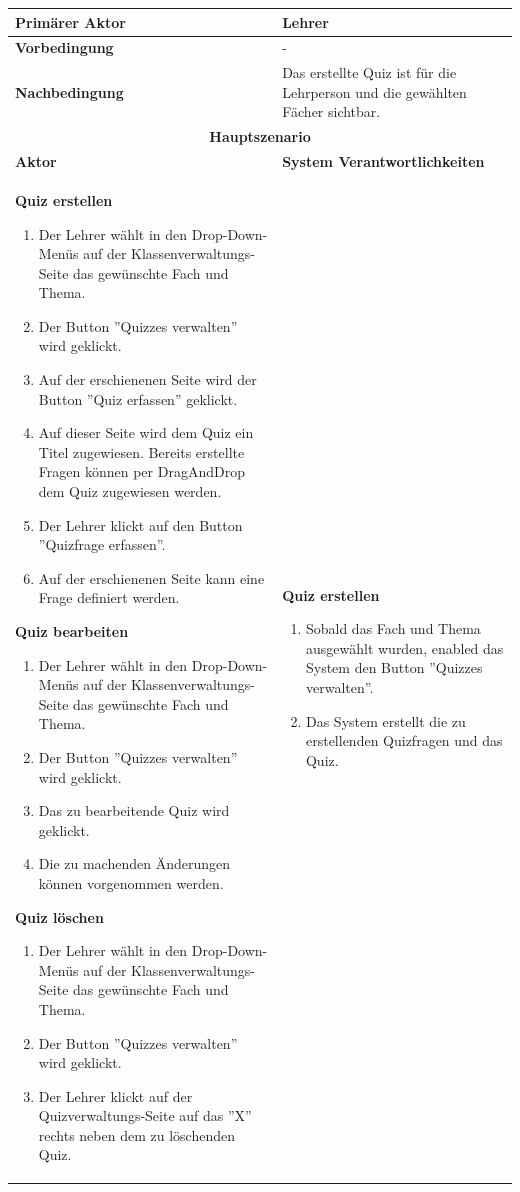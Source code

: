 \begin{tabularx}{\textwidth}{| X | X |}
	\hline
		\textbf{Primärer Aktor} & Lehrer \\
	\hline
		\textbf{Vorbedingung} & - \\
	\hline
		\textbf{Nachbedingung} & Das erstellte Quiz ist für die Lehrperson und die gewählten Fächer sichtbar. \\
	\hline
		\multicolumn{2}{|c|}{\textbf{Hauptszenario}} \\
	\hline
		\textbf{Aktor} & \textbf{System Verantwortlichkeiten} \\
	\hline
		\textbf{Quiz erstellen}
		\begin{enumerate}
			\item Der Lehrer wählt in den Drop-Down-Menüs auf der Klassenverwaltungs-Seite das gewünschte Fach und Thema.
			\item Der Button ''Quizzes verwalten'' wird geklickt.
			\item Auf der erschienenen Seite wird der Button ''Quiz erfassen'' geklickt.
			\item Auf dieser Seite wird dem Quiz ein Titel zugewiesen. Bereits erstellte Fragen können per DragAndDrop dem Quiz zugewiesen werden. 
			\item Der Lehrer klickt auf den Button ''Quizfrage erfassen''.
			\item Auf der erschienenen Seite kann eine Frage definiert werden. 
		\end{enumerate}
		
		\textbf{Quiz bearbeiten}
		\begin{enumerate}
			\item Der Lehrer wählt in den Drop-Down-Menüs auf der Klassenverwaltungs-Seite das gewünschte Fach und Thema.
			\item Der Button ''Quizzes verwalten'' wird geklickt.
			\item Das zu bearbeitende Quiz wird geklickt.
			\item Die zu machenden Änderungen können vorgenommen werden.
		\end{enumerate} 
		
		\textbf{Quiz löschen}
		\begin{enumerate}
			\item Der Lehrer wählt in den Drop-Down-Menüs auf der Klassenverwaltungs-Seite das gewünschte Fach und Thema.
			\item Der Button ''Quizzes verwalten'' wird geklickt.
			\item Der Lehrer klickt auf der Quizverwaltungs-Seite auf das ''X'' rechts neben dem zu löschenden Quiz.
		\end{enumerate} 
			& 
		\textbf{Quiz erstellen}
		\begin{enumerate}
			\item Sobald das Fach und Thema ausgewählt wurden, enabled das System den Button ''Quizzes verwalten''.
			\item Das System erstellt die zu erstellenden Quizfragen und das Quiz.
		\end{enumerate} 
		

\end{tabularx}
